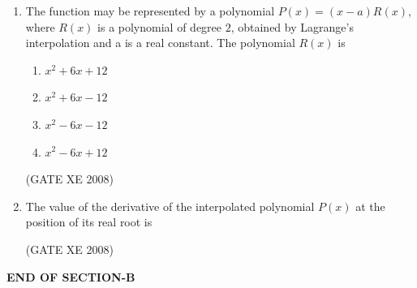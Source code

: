 \documentclass[12pt]{article}
\begin{document}
\begin{enumerate}
(GATE XE 2008)
\\ \\
\textbf{Statement for Linked Answer Questions 33 and 34:}

The values of a function $f(x)$ at four discrete points are as follows:
\begin{center}
\begin{table}[H]     \centering     \caption{}     \label{}     \begin{tabular}{|c|c|c|c|c|}
\hline
   $x$  & $0$ & $1$ & $2$ & $4$\\
   \hline
  $f(x)$   & $-12$ & $0$ & $6$ & $12$\\
  \hline
\end{tabular} \end{table}
\end{center}

\item  The function may be represented by a polynomial $P(x)=(x-a)R(x)$, where $R(x)$ is a polynomial of degree $2$, obtained by Lagrange's interpolation and a is a real constant. The polynomial $R(x)$ is

\begin{enumerate}
\item  $x^2+6x+12$
\item  $x^2+6x-12$
\item  $x^2-6x-12$
\item  $x^2-6x+12$
\end{enumerate}

(GATE XE 2008)
\item The value of the derivative of the interpolated polynomial $P(x)$ at the position of its real root is

\begin{enumerate}
\end{enumerate}

(GATE XE 2008)







\end{enumerate}
    


\begin{center}
    \textbf{END OF SECTION-B}
\end{center}
\end{document}
